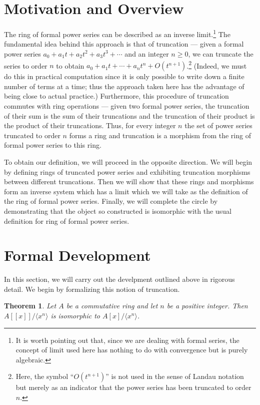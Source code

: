 \documentclass[12pt]{article}
\newtheorem{thm}{Theorem}
\begin{document}
\section{Motivation and Overview}

The ring of formal power series can be described as an inverse
limit.\footnote{It is worth pointing out that, since we are
dealing with formal series, the concept of limit used here has 
nothing to do with convergence but is purely algebraic.}  The
fundamental idea behind this approach is that of truncation ---
given a formal power series $a_0 + a_1 t + a_2 t^2 + a_3 t^3 + 
\cdots$ and an integer $n \ge 0$, we can truncate the series to
order $n$ to obtain $a_0 + a_1 t + \cdots + a_n t^n + 
O(t^{n+1})$.\footnote{Here, the symbol ``$O(t^{n+1})$'' is not
used in the sense of Landau notation but merely as an indicator 
that the power series has been truncated to order $n$.}
(Indeed, we must do this in practical computation since it is
only possible to write down a finite number of terms at a time;
thus the approach taken here has the advantage of being close
to actual practice.)  Furthermore, this procedure of truncation
commutes with ring operations --- given two formal power series,
the truncation of their sum is the sum of their truncations and
the truncation of their product is the product of their 
truncations.  Thus, for every integer $n$ the set of power 
series truncated to order $n$ forms a ring and truncation is a
morphism from the ring of formal power series to this ring.

To obtain our definition, we will proceed in the opposite
direction.  We will begin by defining rings of truncated 
power series and exhibiting truncation morphisms between
different truncations.  Then we will show that these rings 
and morphisms form an inverse system which has a limit which
we will take as the definition of the ring of formal power
series.  Finally, we will complete the circle by demonstrating
that the object so constructed is isomorphic with the usual
definition for ring of formal power series.

\section{Formal Development}

In this section, we will carry out the develpment outlined
above in rigorous detail.  We begin by formalizing this
notion of truncation.

\begin{thm}
Let $A$ be a commutative ring and let $n$ be a positive 
integer.  Then $A[[x]] / \langle x^n \rangle$ is isomorphic
to $A[x] / \langle x^n \rangle$.
\end{thm}
\end{document}
